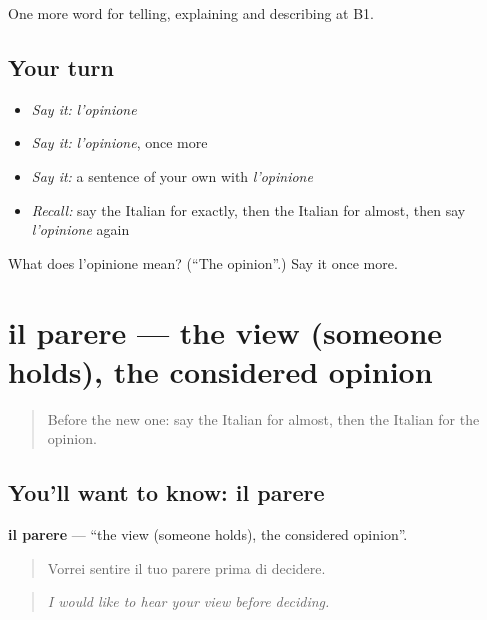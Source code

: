 \begin{grammarlens}[title={What you've built}]
One more word for telling, explaining and describing at B1.
\end{grammarlens}

\subsection*{Your turn}
\begin{itemize}
\raggedright
  \item \emph{Say it:} \emph{l'opinione}
  \item \emph{Say it:} \emph{l'opinione}, once more
  \item \emph{Say it:} a sentence of your own with \emph{l'opinione}
  \item \emph{Recall:} say the Italian for exactly, then the Italian for almost, then say \emph{l'opinione} again
\end{itemize}

\begin{tcolorbox}[breakable,colback=teal!4,colframe=teal!35!black,title={Before you move on}]
What does l'opinione mean? (\textquotedblleft{}The opinion\textquotedblright{}.) Say it once more.
\end{tcolorbox}
\section[il parere]{il parere — the view (someone holds), the considered opinion}

\label{lesson:IT-C339-parere}



\begin{quote}
Before the new one: say the Italian for almost, then the Italian for the opinion.
\end{quote}

\subsection*{You'll want to know: il parere}
\textbf{il parere} — \textquotedblleft{}the view (someone holds), the considered opinion\textquotedblright{}.

\begin{quote}
Vorrei sentire il tuo parere prima di decidere.
\end{quote}

\begin{quote}
\emph{I would like to hear your view before deciding.}
\end{quote}

